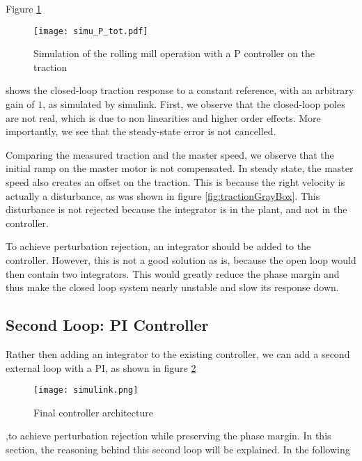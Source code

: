 Figure \ref{fig:simuPTot}
\begin{figure}[htbp]
  \centering
  \texttt{[image: simu\_P\_tot.pdf]}
  \caption{Simulation of the rolling mill operation with a P controller on the traction\label{fig:simuPTot}}
\end{figure}
shows the closed-loop traction response to a constant reference, with an arbitrary gain of $1$, as simulated by simulink. First, we observe that the closed-loop poles are not real, which is due to non linearities and higher order effects. More importantly, we see that the steady-state error is not cancelled.

Comparing the measured traction and the master speed, we observe that the initial ramp on the master motor is not compensated. In steady state, the master speed also creates an offset on the traction. This is because the right velocity is actually a disturbance, as was shown in figure \ref{fig:tractionGrayBox}. This disturbance is not rejected because the integrator is in the plant, and not in the controller.

To achieve perturbation rejection, an integrator should be added to the controller. However, this is not a good solution as is, because the open loop would then contain two integrators. This would greatly reduce the phase margin and thus make the closed loop system nearly unstable and slow its response down.

\subsection{Second Loop: PI Controller}
Rather then adding an integrator to the existing controller, we can add a second external loop with a PI, as shown in figure \ref{fig:simulinkTot}
\begin{figure}[htbp]
  \centering
  \texttt{[image: simulink.png]}
  \caption{Final controller architecture\label{fig:simulinkTot}}
\end{figure}
,to achieve perturbation rejection while preserving the phase margin. In this section, the reasoning behind this second loop will be explained. In the following
